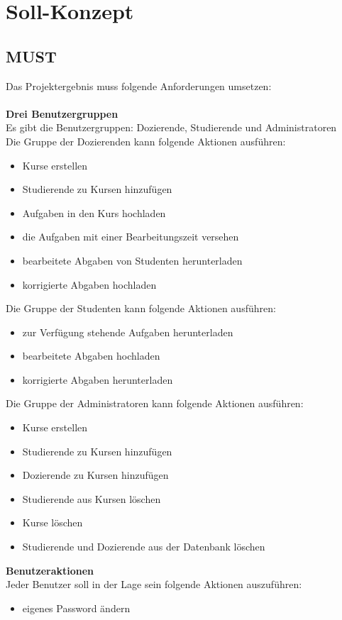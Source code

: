 
\chapter{Soll-Konzept}
\section{MUST}
Das Projektergebnis muss folgende Anforderungen umsetzen: \\ \\
\textbf{Drei Benutzergruppen} \\
Es gibt die Benutzergruppen: Dozierende, Studierende und Administratoren \\
Die Gruppe der Dozierenden kann folgende Aktionen ausführen: 
\begin{itemize}
\item Kurse erstellen
\item Studierende zu Kursen hinzufügen 
\item Aufgaben in den Kurs hochladen
\item die Aufgaben mit einer Bearbeitungszeit versehen
\item bearbeitete Abgaben von Studenten herunterladen
\item korrigierte Abgaben hochladen
\end{itemize}
Die Gruppe der Studenten kann folgende Aktionen ausführen:
\begin{itemize}
\item zur Verfügung stehende Aufgaben herunterladen
\item bearbeitete Abgaben hochladen
\item korrigierte Abgaben herunterladen
\end{itemize}
Die Gruppe der Administratoren kann folgende Aktionen ausführen:
\begin{itemize}
\item Kurse erstellen
\item Studierende zu Kursen hinzufügen
\item Dozierende zu Kursen hinzufügen
\item Studierende aus Kursen löschen
\item Kurse löschen
\item Studierende und Dozierende aus der Datenbank löschen
\end{itemize}

\textbf{Benutzeraktionen} \\
Jeder Benutzer soll in der Lage sein folgende Aktionen auszuführen:
\begin{itemize}
\item eigenes Password ändern
\end{itemize}

